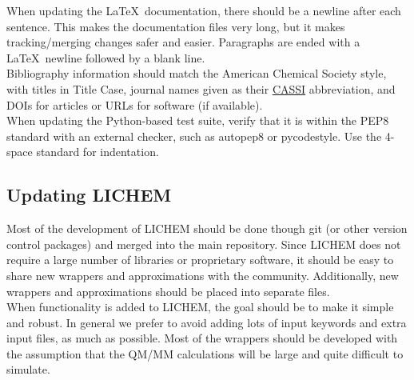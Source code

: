 \documentclass[12pt]{report}
\begin{document}
When updating the \LaTeX\ documentation, there should be a newline after each
sentence.
This makes the documentation files very long, but it makes tracking/merging
changes safer and easier.
Paragraphs are ended with a \LaTeX\ newline followed by a blank line. \\

Bibliography information should match the American Chemical Society style,
with titles in Title Case, journal names given as their
\href{https://cassi.cas.org/search.jsp}{CASSI} abbreviation,
and DOIs for articles or URLs for software (if available). \\

When updating the Python-based test suite, verify that it is within the PEP8
standard with an external checker, such as autopep8 or pycodestyle.
Use the 4-space standard for indentation.

\subsection{Updating LICHEM}

Most of the development of LICHEM should be done though git (or other version
control packages) and merged into the main repository.
Since LICHEM does not require a large number of libraries or proprietary
software, it should be easy to share new wrappers and approximations with the
community.
Additionally, new wrappers and approximations should be placed into separate
files. \\

When functionality is added to LICHEM, the goal should be to make it simple
and robust.
In general we prefer to avoid adding lots of input keywords and extra input
files, as much as possible.
Most of the wrappers should be developed with the assumption that the QM/MM
calculations will be large and quite difficult to simulate.\\


\end{document}
